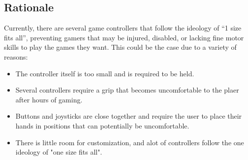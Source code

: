 \documentclass[a4]{article}
\begin{document}
\subsection{Rationale}
Currently, there are several game controllers that follow the ideology of “1 size fits all”, preventing gamers that may be injured, disabled, or lacking fine motor 
skills to play the games they want. This could be the case due to a variety of reasons:
\begin{itemize}
    \item The controller itself is too small and is required to be held.
    \item Several controllers require a grip that becomes uncomfortable to the plaer after hours of gaming.
    \item Buttons and joysticks are close together and require the user to place their hands in positions that can potentially be uncomfortable.
    \item There is little room for customization, and alot of controllers follow the one ideology of "one size fits all".  
\end{itemize}
\end{document}
